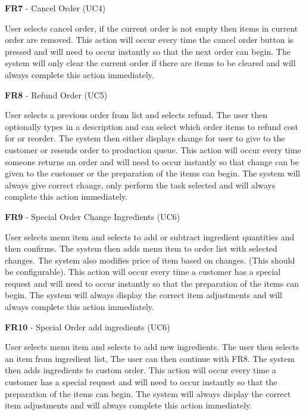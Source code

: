 \noindent \textbf{FR7} - Cancel Order (UC4)\\
\begin{small}
	User selects cancel order, if the current order is not empty then items in current order are removed. This action will occur every time the cancel order button is pressed and will need to occur instantly so that the next order can begin. The system will only clear the current order if there are items to be cleared and will always complete this action immediately.\\
\end{small}
\linebreak
\pagebreak

\noindent \textbf{FR8} - Refund Order (UC5)\\
\begin{small}
	User selects a previous order from list and selects refund. The user then optionally types in a description and can select which order items to refund cost for or reorder. The system then either displays change for user to give to the customer or resends order to production queue. This action will occur every time someone returns an order and will need to occur instantly so that change can be given to the customer or the preparation of the items can begin. The system will always give correct change, only perform the task selected and will always complete this action immediately.\\
\end{small}
\linebreak

\noindent \textbf{FR9} - Special Order Change Ingredients (UC6)\\
\begin{small}
	User selects menu item and selects to add or subtract ingredient quantities and then confirms. The system then adds menu item to order list with selected changes. The system also modifies price of item based on changes. (This should be configurable). This action will occur every time a customer has a special request and will need to occur instantly so that the preparation of the items can begin. The system will always display the correct item adjustments and  will always complete this action immediately.\\
\end{small}
\linebreak

\noindent \textbf{FR10} - Special Order add ingredients (UC6)\\
\begin{small}
	User selects menu item and selects to add new ingredients. The user then selects an item from ingredient list, The user can then continue with FR8. The system then adds ingredients to custom order. This action will occur every time a customer has a special request and will need to occur instantly so that the preparation of the items can begin. The system will always display the correct item adjustments and  will always complete this action immediately.\\
\end{small}
\linebreak

